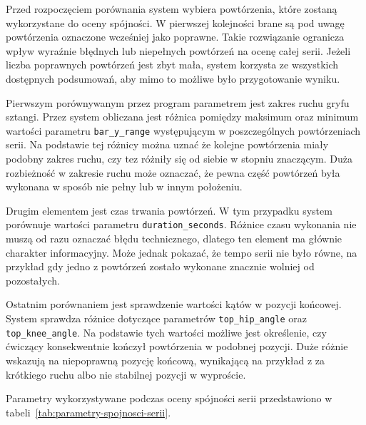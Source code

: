 Przed rozpoczęciem porównania system wybiera powtórzenia, które zostaną wykorzystane do oceny spójności. W pierwszej kolejności brane są pod uwagę powtórzenia oznaczone wcześniej jako poprawne. Takie rozwiązanie ogranicza wpływ wyraźnie błędnych lub niepełnych powtórzeń na ocenę całej serii. Jeżeli liczba poprawnych powtórzeń jest zbyt mała, system korzysta ze wszystkich dostępnych podsumowań, aby mimo to możliwe było przygotowanie wyniku.

Pierwszym porównywanym przez program parametrem jest zakres ruchu gryfu sztangi. Przez system obliczana jest różnica pomiędzy maksimum oraz minimum wartości parametru \texttt{bar\_y\_range} występującym w poszczególnych powtórzeniach serii. Na podstawie tej różnicy można uznać że kolejne powtórzenia miały podobny zakres ruchu, czy tez różniły się od siebie w stopniu znaczącym. Duża rozbieżność w zakresie ruchu może oznaczać, że pewna część powtórzeń była wykonana w sposób nie pełny lub w innym położeniu.

Drugim elementem jest czas trwania powtórzeń. W tym przypadku system porównuje wartości parametru \texttt{duration\_seconds}. Różnice czasu wykonania nie muszą od razu oznaczać błędu technicznego, dlatego ten element ma głównie charakter informacyjny. Może jednak pokazać, że tempo serii nie było równe, na przykład gdy jedno z powtórzeń zostało wykonane znacznie wolniej od pozostałych.

Ostatnim porównaniem jest sprawdzenie wartości kątów w pozycji końcowej. System sprawdza różnice dotyczące parametrów \texttt{top\_hip\_angle} oraz \texttt{top\_knee\_angle}. Na podstawie tych wartości możliwe jest określenie, czy ćwiczący konsekwentnie kończył powtórzenia w podobnej pozycji. Duże różnie wskazują na niepoprawną pozycję końcową, wynikającą na przykład z za krótkiego ruchu albo nie stabilnej pozycji w wyproście.

Parametry wykorzystywane podczas oceny spójności serii przedstawiono w tabeli~\ref{tab:parametry-spojnosci-serii}.

